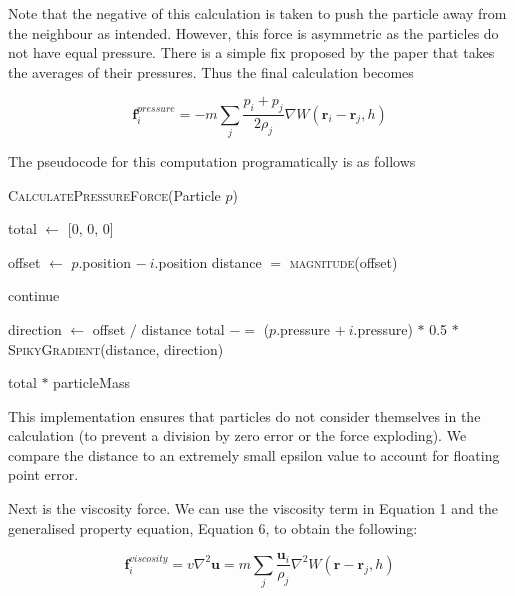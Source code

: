 \documentclass[12pt]{article}
\begin{document}
    Note that the negative of this calculation is taken to push the particle away from the neighbour as intended. However, this force is asymmetric as the particles do not have equal pressure. There is a simple fix proposed by the paper that takes the averages of their pressures. Thus the final calculation becomes

    \begin{equation}
        \textbf{f}^{pressure}_i = -m\sum_{j}\frac{p_i + p_j}{2\rho_j}\nabla{W(\textbf{r}_i - \textbf{r}_j, h)}
    \end{equation}

    The pseudocode for this computation programatically is as follows

    \begin{algorithm}[H]
        \caption{\textsc{CalculatePressureForce}(Particle $p$)}
    
        \begin{algorithmic}
            \State total $\gets$ [0, 0, 0]
            
                \State offset $\gets$ $p$.position $-\ i$.position
                \State distance $=$ \textsc{magnitude}(offset)

                    continue
                \EndIf

                \State direction $\gets$ offset $/$ distance
                \State total $-=$ ($p$.pressure $+\ i$.pressure) $*$ 0.5 $*$ \textsc{SpikyGradient}(distance, direction)
            \EndFor

            \Return total $*$ particleMass
        \end{algorithmic}

    \end{algorithm}

    This implementation ensures that particles do not consider themselves in the calculation (to prevent a division by zero error or the force exploding). We compare the distance to an extremely small epsilon value to account for floating point error.
    
    Next is the viscosity force. We can use the viscosity term in Equation 1 and the generalised property equation, Equation 6, to obtain the following:

    \begin{equation}
        \textbf{f}^{viscosity}_{i} = v\nabla^2\textbf{u} = m\sum_{j}{\frac{\textbf{u}_i}{\rho_j}\nabla^2{W(\textbf{r} - \textbf{r}_j, h)}}
    \end{equation}
\end{document}

